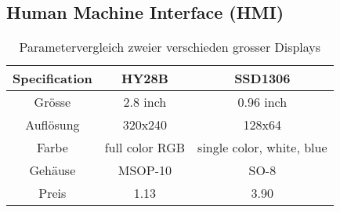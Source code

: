\subsection{Human Machine Interface (HMI)}
\label{subsec:Konzept_HMI}

\begin{table}[H]
	\centering
	\begin{tabular}{|c|c|c|}
		\hline
		\textbf{Specification} & \textbf{HY28B}             & \textbf{SSD1306} \\ \hline
		Grösse              & 2.8 inch                & 0.96 inch    \\ \hline
		Auflösung           & 320x240                         & 128x64      \\ \hline
		Farbe              & full color RGB & single color, white, blue    \\ \hline
		Gehäuse                & MSOP-10                      & SO-8             \\ \hline
		Preis         & 1.13                         & 3.90             \\ \hline
	\end{tabular}
	\caption{Parametervergleich zweier verschieden grosser Displays}
	\label{tab:displays}
\end{table}
